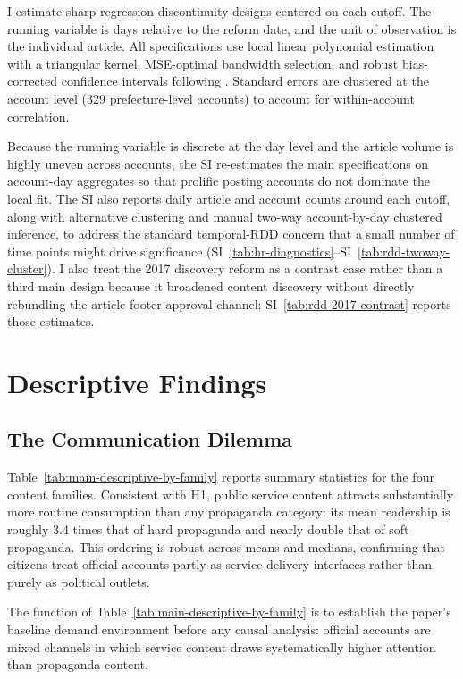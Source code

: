 \documentclass[12pt, american]{article}
\begin{document}
\begin{refsection}
I estimate sharp regression discontinuity designs centered on each cutoff. The running variable is days relative to the reform date, and the unit of observation is the individual article. All specifications use local linear polynomial estimation with a triangular kernel, MSE-optimal bandwidth selection, and robust bias-corrected confidence intervals following \textcite{CalonicoEtAl2014}. Standard errors are clustered at the account level (329 prefecture-level accounts) to account for within-account correlation.

Because the running variable is discrete at the day level and the article volume is highly uneven across accounts, the SI re-estimates the main specifications on account-day aggregates so that prolific posting accounts do not dominate the local fit. The SI also reports daily article and account counts around each cutoff, along with alternative clustering and manual two-way account-by-day clustered inference, to address the standard temporal-RDD concern that a small number of time points might drive significance (SI~\ref{tab:hr-diagnostics}--SI~\ref{tab:rdd-twoway-cluster}). I also treat the 2017 discovery reform as a contrast case rather than a third main design because it broadened content discovery without directly rebundling the article-footer approval channel; SI~\ref{tab:rdd-2017-contrast} reports those estimates.

\section{Descriptive Findings}

\subsection{The Communication Dilemma}

Table~\ref{tab:main-descriptive-by-family} reports summary statistics for the four content families. Consistent with H1, public service content attracts substantially more routine consumption than any propaganda category: its mean readership is roughly 3.4 times that of hard propaganda and nearly double that of soft propaganda. This ordering is robust across means and medians, confirming that citizens treat official accounts partly as service-delivery interfaces rather than purely as political outlets.

The function of Table~\ref{tab:main-descriptive-by-family} is to establish the paper's baseline demand environment before any causal analysis: official accounts are mixed channels in which service content draws systematically higher attention than propaganda content.


\end{refsection}
\end{document}
